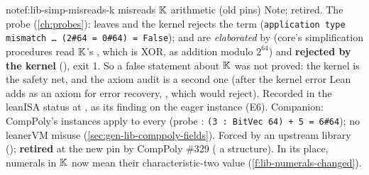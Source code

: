 \begin{finding}{note}{f:lib-simp-misreads-k}{\texorpdfstring{}{simp} misreads \texorpdfstring{$\mathbb{K}$}{K} arithmetic (old pins)}
\textsf{Note; retired.}
 The probe  (\cref{ch:probes}):
 leaves  and the kernel rejects the term
(\texttt{application type mismatch … (2\#64 = 0\#64) = False}); 
and \allowbreak{} are \emph{elaborated} by
 (core's  simplification procedures read $\mathbb{K}$'s \lean{+}, which is XOR, as
addition modulo $2^{64}$) and \textbf{rejected by the kernel} (),
exit 1. So a false statement about $\mathbb{K}$ was not proved: the kernel is the safety net, and the axiom
audit is a second one (after the kernel error Lean adds  as an axiom for error recovery,
, which  would
reject). Recorded in the leanISA status at , as its finding on the eager instance (E6). Companion: CompPoly's instances
apply to every  (probe : \texttt{(3 : BitVec 64) + 5 = 6\#64}); no
leanerVM misuse (\cref{sec:gen-lib-comppoly-fields}).
 Forced by an upstream library ();
\textbf{retired} at the new pin by CompPoly \#329 ( a structure). In its place, numerals
in $\mathbb{K}$ now mean their characteristic-two value (\cref{f:lib-numerals-changed}).
\end{finding}

